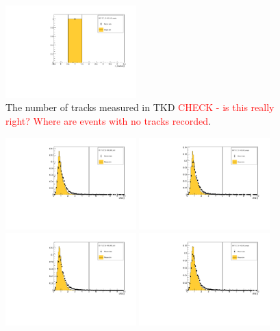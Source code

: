 \begin{figure}[!tbh]
    \includegraphics*[width=0.45\textwidth]{02-Cuts/Figures/2017-2.7_10-140_lH2_empty/tkd_n_tracks_ds_cut.pdf}
    \caption{The number of tracks measured in TKD \textcolor{red}{CHECK - is this really right? Where are events with no tracks recorded}.
\label{fig:tkd_n_tracks}}
\end{figure}

\begin{figure}[!tbh]
    \centering
    \includegraphics*[width=0.45\textwidth]{02-Cuts/Figures/2017-2.7_3-140_lH2_full/tkd_chi2_ds_cut.pdf}
    \includegraphics*[width=0.45\textwidth]{02-Cuts/Figures/2017-2.7_3-140_lH2_empty/tkd_chi2_ds_cut.pdf}
    \includegraphics*[width=0.45\textwidth]{02-Cuts/Figures/2017-2.7_6-140_lH2_full/tkd_chi2_ds_cut.pdf}
    \includegraphics*[width=0.45\textwidth]{02-Cuts/Figures/2017-2.7_6-140_lH2_empty/tkd_chi2_ds_cut.pdf}

\end{figure}
